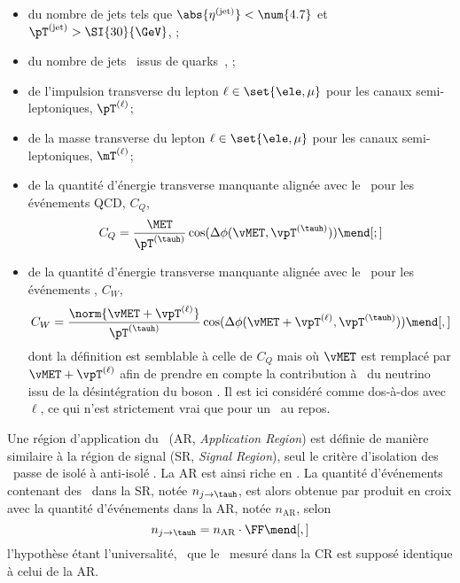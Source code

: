 \begin{itemize}
\item du nombre de jets tels que $\abs{\eta^{(\text{jet})}}<\num{4.7}$ et $\pT^{(\text{jet})}>\SI{30}{\GeV}$, \Njets;
\item du nombre de jets \Nprebjets\ issus de quarks~\quarkb, \Nbjets;
\item de l'impulsion transverse du lepton $\ell\in\set{\ele,\mu}$ pour les canaux semi-leptoniques, $\pT^{(\ell)}$;
\item de la masse transverse du lepton $\ell\in\set{\ele,\mu}$ pour les canaux semi-leptoniques, $\mT^{(\ell)}$;
\item de la quantité d'énergie transverse manquante alignée avec le \tauh\ pour les événements QCD, $C_Q$,
\begin{equation}
C_Q = \frac{\MET}{\pT^{(\tauh)}} \cos(\Delta\phi(\vMET, \vpT^{(\tauh)}))
\mend[;]
\label{eq-FF_CQ_def}
\end{equation}
\item de la quantité d'énergie transverse manquante alignée avec le \tauh\ pour les événements \Wjets, $C_W$,
\begin{equation}
C_W = \frac{\norm{\vMET + \vpT^{(\ell)}}}{\pT^{(\tauh)}} \cos(\Delta\phi(\vMET + \vpT^{(\ell)}, \vpT^{(\tauh)}))
\mend[,]
\label{eq-FF_CW_def}
\end{equation}
dont la définition est semblable à celle de $C_Q$ mais où $\vMET$ est remplacé par $\vMET + \vpT^{(\ell)}$ afin de prendre en compte la contribution à \MET\ du neutrino issu de la désintégration du boson \Wboson.
Il est ici considéré comme dos-à-dos avec $\ell$, ce qui n'est strictement vrai que pour un \Wboson\ au repos.
\end{itemize}
\par
Une région d'application du \fakefactor\ (AR, \emph{Application Region}) est définie de manière similaire à la région de signal (SR, \emph{Signal Region}), seul le critère d'isolation des \tauh\ passe de \og isolé \fg{}  à \og anti-isolé \fg.
La AR est ainsi riche en \ftauhs.
La quantité d'événements contenant des \ftauhs\ dans la SR, notée $n_{j\to\tauh}$, est alors obtenue par produit en croix avec la quantité d'événements dans la AR, notée $n_\text{AR}$,  selon
\begin{equation}
n_{j\to\tauh} = n_\text{AR} \cdot \FF
\mend[,]
\end{equation}
l'hypothèse étant l'universalité, \ie\ que le \fakefactor\ mesuré dans la CR est supposé identique à celui de la AR.
